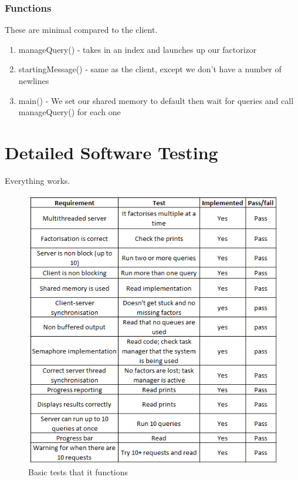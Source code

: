 \documentclass{article}
\begin{document}
    \subsubsection*{Functions}
    These are minimal compared to the client.
    \begin{enumerate}
        \item manageQuery() - takes in an index and launches up our factorizor
        \item startingMessage() - same as the client, except we
        don't have a number of newlines
        \item main() - We set our shared memory to default then wait for queries
        and call manageQuery() for each one
    \end{enumerate}

    \newpage
    \section{Detailed Software Testing}
    Everything works.
    \begin{figure}[ht!]
        \centering
        \includegraphics{figures/basicSoftwareTesting.png}
        \caption{Basic tests that it functions}
        \label{fig:basicTesting}
    \end{figure}
\end{document}
